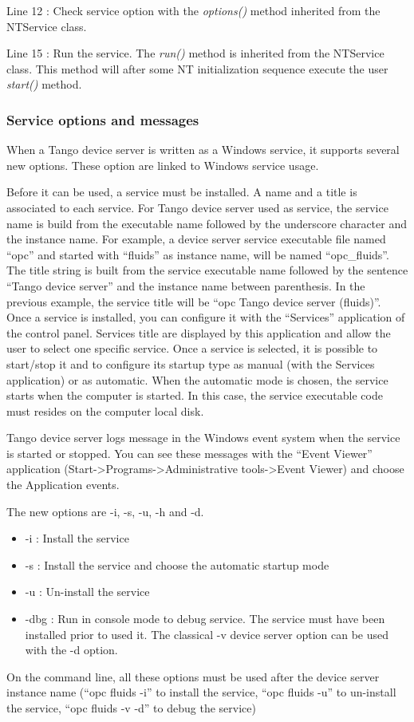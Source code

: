 Line 12 : Check service option with the \emph{options()} method inherited
from the NTService class.

Line 15 : Run the service. The \emph{run()} method is inherited from
the NTService class. This method will after some NT initialization
sequence execute the user \emph{start()} method.


\subsubsection{Service options and messages}

When a Tango device server is written as a Windows service, it supports
several new options. These option are linked to Windows service
usage.

Before it can be used, a service must be installed. A name and a title
is associated to each service. For Tango device server used as service,
the service name is build from the executable name followed by the
underscore character and the instance name. For example, a device
server service executable file named ``opc'' and started with ``fluids''
as instance name, will be named ``opc\_fluids''. The title string
is built from the service executable name followed by the sentence
``Tango device server'' and the instance name between parenthesis.
In the previous example, the service title will be ``opc Tango device
server (fluids)''. Once a service is installed, you can configure
it with the ``Services'' application of the control panel. Services
title are displayed by this application and allow the user to select
one specific service. Once a service is selected, it is possible to
start/stop it and to configure its startup type as manual (with the
Services application) or as automatic. When the automatic mode is
chosen, the service starts when the computer is started. In this case,
the service executable code must resides on the computer local disk.

Tango device server logs message in the Windows event
system when the service is started or stopped. You can see these messages
with the ``Event Viewer'' application (Start->Programs->Administrative
tools->Event Viewer) and choose the Application events.

The new options are -i, -s, -u, -h and -d.
\begin{itemize}
\item -i : Install the service
\item -s : Install the service and choose the automatic startup mode
\item -u : Un-install the service
\item -dbg : Run in console mode to debug service. The service must have
been installed prior to used it. The classical -v device server option
can be used with the -d option.
\end{itemize}
On the command line, all these options must be used after the device
server instance name (``opc fluids -i'' to install the service,
``opc fluids -u'' to un-install the service, ``opc fluids -v -d''
to debug the service)


